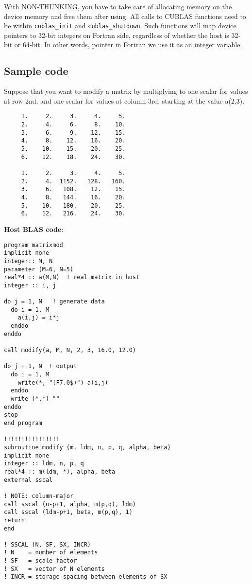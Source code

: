 With NON-THUNKING, you have to take care of allocating memory on the
device memory and free them after using.  All calls to CUBLAS
functions need to be within \verb!cublas_init! and
\verb!cublas_shutdown!. Such functions will map device pointers to
32-bit integers on Fortran side, regardless of whether the host is
32-bit or 64-bit. In other words, pointer in Fortran we use it as an
integer variable.


\subsection{Sample code}
\label{sec:sample-code-1}

Suppose that you want to modify a matrix by multiplying to one scalar
for values at row 2nd, and one scalar for values at column 3rd,
starting at the value a(2,3).
\begin{verbatim}
     1.     2.     3.     4.     5. 
     2.     4.     6.     8.    10. 
     3.     6.     9.    12.    15. 
     4.     8.    12.    16.    20. 
     5.    10.    15.    20.    25. 
     6.    12.    18.    24.    30. 
 
     1.     2.     3.     4.     5. 
     2.     4.  1152.   128.   160. 
     3.     6.   108.    12.    15. 
     4.     8.   144.    16.    20. 
     5.    10.   180.    20.    25. 
     6.    12.   216.    24.    30. 
\end{verbatim}

{\bf Host BLAS code}:
\begin{lstlisting}
program matrixmod
implicit none
integer:: M, N
parameter (M=6, N=5)
real*4 :: a(M,N)  ! real matrix in host
integer :: i, j

do j = 1, N   ! generate data
  do i = 1, M
    a(i,j) = i*j
  enddo
enddo

call modify(a, M, N, 2, 3, 16.0, 12.0) 

do j = 1, N  ! output
  do i = 1, M
    write(*, "(F7.0$)") a(i,j)
  enddo
  write (*,*) ""
enddo
stop
end program

!!!!!!!!!!!!!!!!
subroutine modify (m, ldm, n, p, q, alpha, beta)
implicit none
integer :: ldm, n, p, q
real*4 :: m(ldm, *), alpha, beta
external sscal

! NOTE: column-major
call sscal (n-p+1, alpha, m(p,q), ldm)
call sscal (ldm-p+1, beta, m(p,q), 1)
return
end

! SSCAL (N, SF, SX, INCR)
! N    = number of elements
! SF   = scale factor
! SX   = vector of N elements
! INCR = storage spacing between elements of SX
\end{lstlisting}


